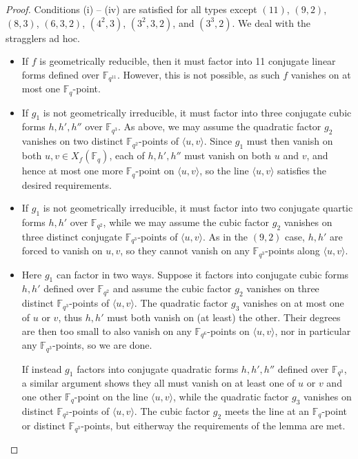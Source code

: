 \documentclass{amsart}
\newcommand{\F}{\mathbb{F}}
\newcommand{\Span}[1]{\langle #1 \rangle}
\theoremstyle{definition}
\numberwithin{equation}{section}
\numberwithin{table}{section}
\begin{document}
\begin{proof}
    Conditions (i) -- (iv) are satisfied for all types except $(11)$, $(9,2)$, $(8,3)$, $(6,3,2)$, $(4^2,3)$, $(3^2,3,2)$, and $(3^3,2)$. We deal with the stragglers ad hoc.

    \begin{itemize}\setlength{\itemsep}{1ex}
        \item[$(11)$] If $f$ is geometrically reducible, then it must factor into 11 conjugate linear forms defined over $\F_{q^{11}}$. However, this is not possible, as such $f$ vanishes on at most one $\F_q$-point.

        \item[$(9,2)$] If $g_1$ is not geometrically irreducible, it must factor into three conjugate cubic forms $h,h',h''$ over $\F_{q^3}$. As above, we may assume the quadratic factor $g_2$ vanishes on two distinct $\F_{q^2}$-points of $\Span{u,v}$. Since $g_1$ must then vanish on both $u,v \in X_f(\F_q)$, each of $h,h',h''$ must vanish on both $u$ and $v$, and hence at most one more $\F_q$-point on $\Span{u,v}$, so the line $\Span{u,v}$ satisfies the desired requirements.

        \item[$(8,3)$] If $g_1$ is not geometrically irreducible, it must factor into two conjugate quartic forms $h,h'$ over $\F_{q^2}$, while we may assume the cubic factor $g_2$ vanishes on three distinct conjugate $\F_{q^3}$-points of $\Span{u,v}$. As in the $(9,2)$ case, $h,h'$ are forced to vanish on $u,v$, so they cannot vanish on any $\F_{q^3}$-points along $\Span{u,v}$.

        \item[$(6,3,2)$] Here $g_1$ can factor in two ways. Suppose it factors into conjugate cubic forms $h,h'$ defined over $\F_{q^2}$ and assume the cubic factor $g_2$ vanishes on three distinct $\F_{q^3}$-points of $\Span{u,v}$. The quadratic factor $g_3$ vanishes on at most one of $u$ or $v$, thus $h,h'$ must both vanish on (at least) the other. Their degrees are then too small to also vanish on any $\F_{q^6}$-points on $\Span{u,v}$, nor in particular any $\F_{q^3}$-points, so we are done.

        If instead $g_1$ factors into conjugate quadratic forms $h,h',h''$ defined over $\F_{q^3}$, a similar argument shows they all must vanish on at least one of $u$ or $v$ and one other $\F_q$-point on the line $\Span{u,v}$, while the quadratic factor $g_3$ vanishes on distinct $\F_{q^2}$-points of $\Span{u,v}$. The cubic factor $g_2$ meets the line at an $\F_q$-point or distinct $\F_{q^3}$-points, but eitherway the requirements of the lemma are met.


\end{itemize}
\end{proof}
\end{document}
